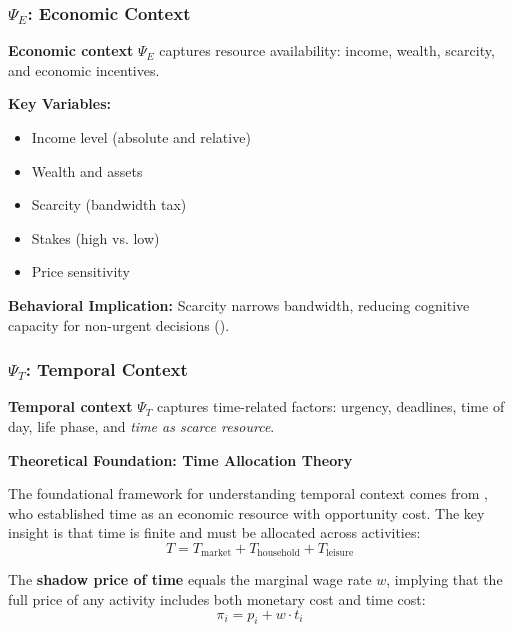 \subsubsection{$\Psi_E$: Economic Context}

\begin{definition}
\textbf{Economic context} $\Psi_E$ captures resource availability:
income, wealth, scarcity, and economic incentives.
\end{definition}

\textbf{Key Variables:}
\begin{itemize}[nosep]
\item Income level (absolute and relative)
\item Wealth and assets
\item Scarcity (bandwidth tax)
\item Stakes (high vs. low)
\item Price sensitivity
\end{itemize}

\textbf{Behavioral Implication:}
Scarcity narrows bandwidth, reducing cognitive capacity for non-urgent decisions
(\citet{mullainathan2013scarcity}).

\subsubsection{$\Psi_T$: Temporal Context}

\begin{definition}
\textbf{Temporal context} $\Psi_T$ captures time-related factors:
urgency, deadlines, time of day, life phase, and \textit{time as scarce resource}.
\end{definition}

\textbf{Theoretical Foundation: Time Allocation Theory}

The foundational framework for understanding temporal context comes from
\citet{becker1965theory}, who established time as an economic resource with
opportunity cost. The key insight is that time is finite and must be allocated
across activities:
\begin{equation}
T = T_{\text{market}} + T_{\text{household}} + T_{\text{leisure}}
\end{equation}

The \textbf{shadow price of time} equals the marginal wage rate $w$, implying
that the full price of any activity includes both monetary cost and time cost:
\begin{equation}
\pi_i = p_i + w \cdot t_i
\end{equation}

